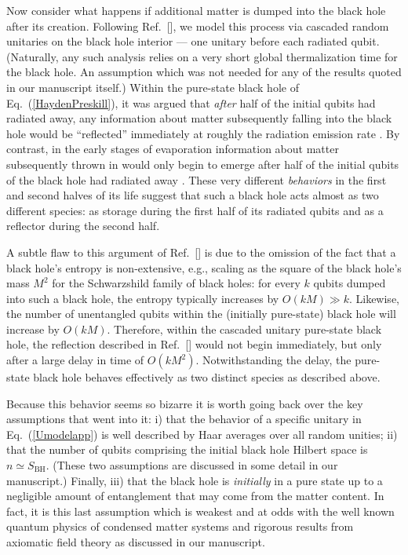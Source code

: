 \documentclass[twocolumn,aps,showpacs,prl]{revtex4}
\begin{document}
Now consider what happens if additional matter is dumped into the 
black hole after its creation. Following Ref.~[], 
we model this process via cascaded random unitaries on the black hole 
interior --- one unitary before each radiated qubit. (Naturally, any
such analysis relies on a very short global thermalization time for
the black hole. An assumption which was not needed for any of the
results quoted in our manuscript itself.) Within the pure-state black
hole of Eq.~(\ref{HaydenPreskill}), it was argued \cite{Hayden07app} 
that {\it after\/} half of the initial qubits had radiated away, any
information about matter subsequently falling into the black hole
would be ``reflected'' immediately at roughly the radiation emission
rate \cite{Hayden07app}. By contrast, in the early stages of evaporation
information about matter subsequently thrown in would only begin
to emerge after half of the initial qubits of the black hole had
radiated away \cite{Hayden07app}. These very different {\it behaviors\/}
in the first and second halves of its life suggest that such a black
hole acts almost as two different species: as storage during the first
half of its radiated qubits and as a reflector during the second half.

A subtle flaw to this argument of Ref.~[] is due
to the omission of the fact that a black hole's entropy is
non-extensive, e.g., scaling as the square of the black hole's
mass $M^2$ for the Schwarzshild family of black holes: for every $k$
qubits dumped into such a black hole, the entropy typically increases
by $O(k M)\gg k$. Likewise, the number of unentangled qubits within
the (initially pure-state) black hole will increase by $O(k M)$.
Therefore, within the cascaded unitary pure-state black hole, the
reflection described in Ref.~[] would not
begin immediately, but only after a large delay in time of
$O(k M^2)$. Notwithstanding the delay, the pure-state black hole
behaves effectively as two distinct species as described above.

Because this behavior seems so bizarre it is worth going back over the
key assumptions that went into it: i) that the behavior of a specific
unitary in Eq.~(\ref{Umodelapp}) is well described by Haar averages over 
all random unities; ii) that the number of qubits comprising the initial
black hole Hilbert space is $n\simeq S_{\text{BH}}$. (These two
assumptions are discussed in some detail in our manuscript.) Finally,
iii) that the black hole is {\it initially\/} in a pure state up
to a negligible amount of entanglement that may come from the matter
content. In fact, it is this last assumption which is weakest and at
odds with the well known quantum physics of condensed matter systems
and rigorous results from axiomatic field theory as discussed in
our manuscript.
\end{document}
